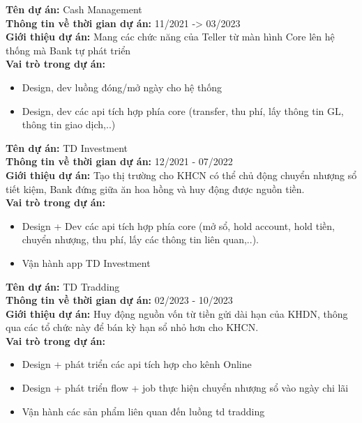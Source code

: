\documentclass[11pt,a4paper,sans]{moderncv}
\begin{document}
\begin{mdframed}[style=ProjectFrame]
	\textbf{Tên dự án:} Cash Management \\
	\textbf{Thông tin về thời gian dự án:} 11/2021 -> 03/2023 \\
	\textbf{Giới thiệu dự án:}	Mang các chức năng của Teller từ màn hình Core lên hệ thống mà Bank tự phát triển\\
	\textbf{Vai trò trong dự án:}
	\begin{itemize}[leftmargin=0.6cm,noitemsep,topsep=0pt,label=-]
	\item Design, dev luồng đóng/mở ngày cho hệ thống
	\item Design, dev các api tích hợp phía core (transfer, thu phí, lấy thông tin GL, thông tin giao dịch,..)
	\end{itemize}
\end{mdframed}

\begin{mdframed}[style=ProjectFrame]
	\textbf{Tên dự án:} TD Investment \\
	\textbf{Thông tin về thời gian dự án:} 12/2021 - 07/2022 \\
	\textbf{Giới thiệu dự án:} Tạo thị trường cho KHCN có thể chủ động chuyển nhượng sổ tiết kiệm, Bank đứng giữa ăn hoa hồng và huy động được nguồn tiền.\\
	\textbf{Vai trò trong dự án:}
	\begin{itemize}[leftmargin=0.6cm,noitemsep,topsep=0pt,label=-]
		\item Design + Dev các api tích hợp phía core (mở sổ, hold account, hold tiền, chuyển nhượng, thu phí, lấy các thông tin liên quan,..).
		\item Vận hành app TD Investment
	\end{itemize}
\end{mdframed}

\begin{mdframed}[style=ProjectFrame]
	\textbf{Tên dự án:} TD Tradding\\
	\textbf{Thông tin về thời gian dự án:} 02/2023 - 10/2023 \\
	\textbf{Giới thiệu dự án:} Huy động nguồn vốn từ tiền gửi dài hạn của KHDN, thông qua các tổ chức này để bán kỳ hạn sổ nhỏ hơn cho KHCN.\\
	\textbf{Vai trò trong dự án:}
	\begin{itemize}[leftmargin=0.6cm,noitemsep,topsep=0pt,label=-]
		\item Design + phát triển các api tích hợp cho kênh Online
		\item Design + phát triển flow + job thực hiện chuyển nhượng sổ vào ngày chi lãi
		\item Vận hành các sản phẩm liên quan đến luồng td tradding
	\end{itemize}
\end{mdframed}
\end{document}
